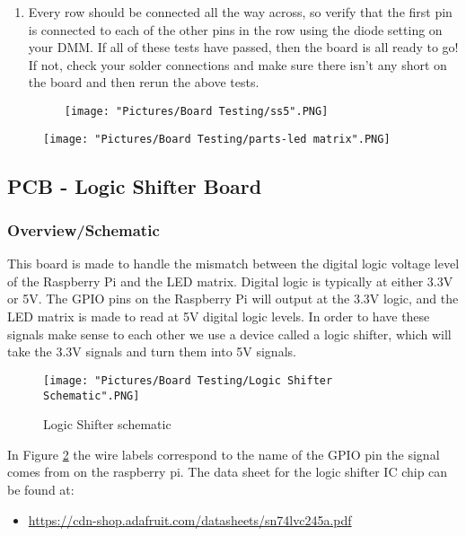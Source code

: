 \documentclass[12pt]{article}
\begin{document}
\begin{enumerate}
	\item Every row should be connected all the way across, so verify that the first pin is connected to each of the other pins in the row using the diode setting on your DMM. If all of these tests have passed, then the board is all ready to go! If not, check your solder connections and make sure there isn't any short on the board and then rerun the above tests.

	\begin{figure}[H]
	  	\centering
	    	\texttt{[image: "Pictures/Board Testing/ss5".PNG]}
		\label{ss5}
	\end{figure}

\end{enumerate}

\begin{figure}[H]
	\centering
	\texttt{[image: "Pictures/Board Testing/parts-led matrix".PNG]}
\end{figure}


\subsection{PCB - Logic Shifter Board} 
\subsubsection{Overview/Schematic}
This board is made to handle the mismatch between the digital logic voltage level of the Raspberry Pi and the LED matrix. Digital logic is typically at either 3.3V or 5V. The GPIO pins on the Raspberry Pi will output at the 3.3V logic, and the LED matrix is made to read at 5V digital logic levels. In order to have these signals make sense to each other we use a device called a logic shifter, which will take the 3.3V signals and turn them into 5V signals.

\begin{figure}[H]
  	\centering
    	\texttt{[image: "Pictures/Board Testing/Logic Shifter Schematic".PNG]}
 	\caption{Logic Shifter schematic}
	\label{ls sch}
\end{figure}

In Figure \ref{ls sch} the wire labels correspond to the name of the GPIO pin the signal comes from on the raspberry pi. The data sheet for the logic shifter IC chip can be found at: 
\begin{itemize}
	\item \href{https://cdn-shop.adafruit.com/datasheets/sn74lvc245a.pdf}{https://cdn-shop.adafruit.com/datasheets/sn74lvc245a.pdf}
\end{itemize}
\end{document}
